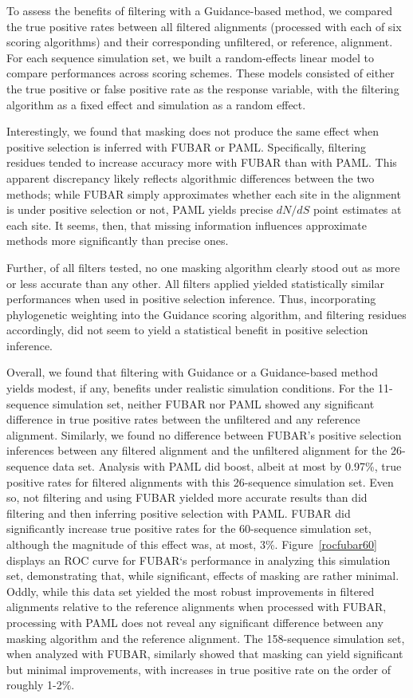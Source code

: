 \documentclass[10pt]{article}
\begin{document}
To assess the benefits of filtering with a Guidance-based method, we compared the true positive rates between all filtered alignments (processed with each of six scoring algorithms) and their corresponding unfiltered, or reference, alignment. For each sequence simulation set, we built a random-effects linear model to compare performances across scoring schemes. These models consisted of either the true positive or false positive rate as the response variable, with the filtering algorithm as a fixed effect and simulation as a random effect. 

Interestingly, we found that masking does not produce the same effect when positive selection is inferred with FUBAR or PAML. Specifically, filtering residues tended to increase accuracy more with FUBAR than with PAML. This apparent discrepancy likely reflects algorithmic differences between the two methods; while FUBAR simply approximates whether each site in the alignment is under positive selection or not, PAML yields precise $dN/dS$ point estimates at each site. It seems, then, that missing information influences approximate methods more significantly than precise ones.

Further, of all filters tested, no one masking algorithm clearly stood out as more or less accurate than any other. All filters applied yielded statistically similar performances when used in positive selection inference. Thus, incorporating phylogenetic weighting into the Guidance scoring algorithm, and filtering residues accordingly, did not seem to yield a statistical benefit in positive selection inference. 

Overall, we found that filtering with Guidance or a Guidance-based method yields modest, if any, benefits under realistic simulation conditions. 
For the 11-sequence simulation set, neither FUBAR nor PAML showed any significant difference in true positive rates between the unfiltered and any reference alignment. Similarly, we found no difference between FUBAR’s positive selection inferences between any filtered alignment and the unfiltered alignment for the 26-sequence data set. Analysis with PAML did boost, albeit at most by 0.97\%, true positive rates for filtered alignments with this 26-sequence simulation set. Even so, not filtering and using FUBAR yielded more accurate results than did filtering and then inferring positive selection with PAML. 
FUBAR did significantly increase true positive rates for the 60-sequence simulation set, although the magnitude of this effect was, at most, 3\%. Figure~\ref{rocfubar60} displays an ROC curve for FUBAR`s performance in analyzing this simulation set, demonstrating that, while significant, effects of masking are rather minimal. Oddly, while this data set yielded the most robust improvements in filtered alignments relative to the reference alignments when processed with FUBAR, processing with PAML does not reveal any significant difference between any masking algorithm and the reference alignment.
The 158-sequence simulation set, when analyzed with FUBAR, similarly showed that masking can yield significant but minimal improvements, with increases in true positive rate on the order of roughly 1-2\%. 
\end{document}
